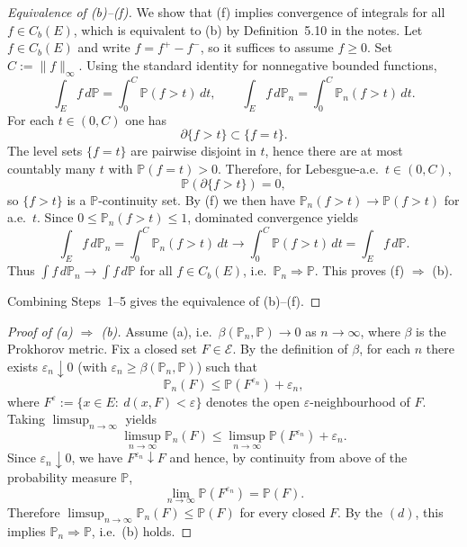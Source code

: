 \begin{proof}[Equivalence of \textnormal{(b)}--\textnormal{(f)}]
\medskip
{}
We show that \textnormal{(f)} implies convergence of integrals for all $f\in C_b(E)$, which is
equivalent to \textnormal{(b)} by Definition~5.10 in the notes. 
Let $f\in C_b(E)$ and write $f=f^+-f^-$, so it suffices to assume $f\ge 0$.
Set $C:=\|f\|_\infty$. Using the standard identity for nonnegative bounded functions,
\[
\int_E f\,d\mathbb{P}=\int_{0}^{C}\mathbb{P}(f>t)\,dt,
\qquad
\int_E f\,d\mathbb{P}_n=\int_{0}^{C}\mathbb{P}_n(f>t)\,dt.
\]
For each $t\in(0,C)$ one has
\[
\partial\{f>t\}\subset \{f=t\}.
\]
The level sets $\{f=t\}$ are pairwise disjoint in $t$, hence there are at most countably many
$t$ with $\mathbb{P}(f=t)>0$. Therefore, for Lebesgue-a.e.\ $t\in(0,C)$,
\[
\mathbb{P}(\partial\{f>t\})=0,
\]
so $\{f>t\}$ is a $\mathbb{P}$-continuity set. By \textnormal{(f)} we then have
$\mathbb{P}_n(f>t)\to \mathbb{P}(f>t)$ for a.e.\ $t$.
Since $0\le \mathbb{P}_n(f>t)\le 1$, dominated convergence yields
\[
\int_E f\,d\mathbb{P}_n
=\int_{0}^{C}\mathbb{P}_n(f>t)\,dt
\longrightarrow
\int_{0}^{C}\mathbb{P}(f>t)\,dt
=\int_E f\,d\mathbb{P}.
\]
Thus $\int f\,d\mathbb{P}_n\to \int f\,d\mathbb{P}$ for all $f\in C_b(E)$, i.e.\ $\mathbb{P}_n\Rightarrow \mathbb{P}$.
This proves \textnormal{(f)} $\Rightarrow$ \textnormal{(b)}. 

\medskip
Combining Steps~1--5 gives the equivalence of \textnormal{(b)}--\textnormal{(f)}.
\end{proof}




\begin{proof}[Proof of \textnormal{(a)} $\Rightarrow$ \textnormal{(b)}]
Assume \textnormal{(a)}, i.e.\ $\beta(\mathbb{P}_n,\mathbb{P})\to 0$ as $n\to\infty$, where $\beta$ is the Prokhorov metric.
Fix a closed set $F\in\mathcal{E}$. By the definition of $\beta$, for each $n$ there exists $\varepsilon_n\downarrow 0$
(with $\varepsilon_n \ge \beta(\mathbb{P}_n,\mathbb{P})$) such that
\[
\mathbb{P}_n(F)\le \mathbb{P}(F^{\varepsilon_n})+\varepsilon_n,
\]
where $F^{\varepsilon}:=\{x\in E:\ d(x,F)<\varepsilon\}$ denotes the open $\varepsilon$-neighbourhood of $F$.
Taking $\limsup_{n\to\infty}$ yields
\[
\limsup_{n\to\infty}\mathbb{P}_n(F)
\le \limsup_{n\to\infty}\mathbb{P}(F^{\varepsilon_n})+\varepsilon_n.
\]
Since $\varepsilon_n\downarrow 0$, we have $F^{\varepsilon_n}\downarrow F$ and hence, by continuity from above of
the probability measure $\mathbb{P}$,
\[
\lim_{n\to\infty}\mathbb{P}(F^{\varepsilon_n})=\mathbb{P}(F).
\]
Therefore $\limsup_{n\to\infty}\mathbb{P}_n(F)\le \mathbb{P}(F)$ for every closed $F$.
By the $(d)$, this implies $\mathbb{P}_n \Rightarrow \mathbb{P}$,
i.e.\ \textnormal{(b)} holds.
\end{proof}


